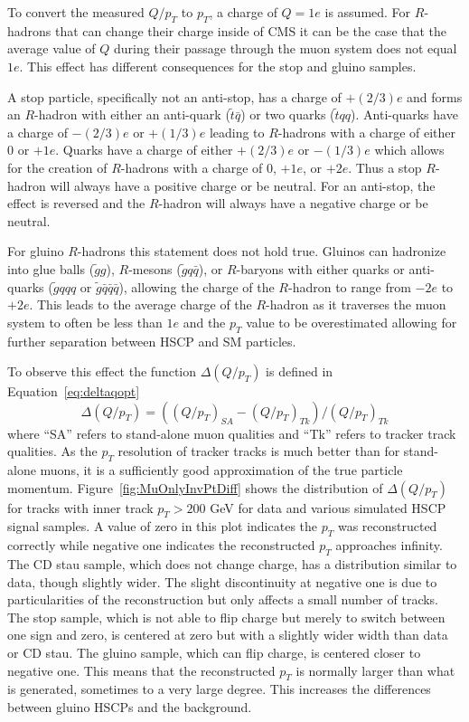 To convert the measured $Q/p_T$ to $p_T$, a charge of $Q=1e$ is assumed.
For $R$-hadrons that can change their charge inside of CMS it can be the case that the average value of $Q$ during their passage through the muon system does not equal $1e$.
This effect has different consequences for the stop and gluino samples.

A stop particle, specifically not an anti-stop, has a charge of $+(2/3)e$ and forms an $R$-hadron with either an anti-quark ($\tilde{t} \bar{q}$) or
two quarks  ($\tilde{t} q q$). Anti-quarks have a charge of $-(2/3)e$ or $+(1/3)e$ leading to $R$-hadrons with a charge
of either 0 or $+1e$. Quarks have a charge of either $+(2/3)e$ or $-(1/3)e$ which allows for
the creation of $R$-hadrons with a charge of 0, $+1e$, or $+2e$. Thus a stop $R$-hadron will always have a
positive charge or be neutral. For an anti-stop, the effect is reversed and the $R$-hadron will always have a
negative charge or be neutral.

For gluino $R$-hadrons this statement does not hold true. Gluinos can hadronize into glue balls ($\tilde{g}g$), $R$-mesons ($\tilde{g} q \bar{q}$), or
$R$-baryons  with either quarks or anti-quarks ($\tilde{g} qqq$ or $\tilde{g} \bar{q}\bar{q}\bar{q}$),
allowing the charge of the $R$-hadron to range from $-2e$ to $+2e$. This leads to the
average charge of the $R$-hadron as it traverses the muon system to often be less than $1e$ and the $p_T$ value to be overestimated allowing for further separation
between HSCP and SM particles.

To observe this effect the function
$\Delta(Q/p_T)$ is defined in Equation~\ref{eq:deltaqopt}
\begin{equation}
\Delta(Q/p_T) = ((Q/p_T)_{SA} - (Q/p_T)_{Tk})/(Q/p_T)_{Tk}
\label{eq:deltaqopt}
\end{equation}
where ``SA'' refers to stand-alone muon qualities and ``Tk'' refers to
tracker track qualities. As the $p_T$ resolution of tracker tracks is much better than for stand-alone muons, it is a sufficiently good approximation
of the true particle momentum. Figure~\ref{fig:MuOnlyInvPtDiff} shows the distribution of
$\Delta(Q/p_T)$ for tracks with inner track $p_T > 200$ GeV
for data and various simulated HSCP signal samples.
A value of zero in this plot indicates the $p_T$ was reconstructed correctly
while negative one indicates the reconstructed $p_T$ approaches infinity.
The CD stau sample, which does not change charge,
has a distribution similar to data, though slightly wider.
The slight discontinuity at negative one is due to particularities of the reconstruction but only affects a small number of tracks.
The stop sample, which is not able to flip charge but merely to switch
between one sign and zero, is centered at zero but with a slightly wider
width than data or CD stau.
The gluino sample, which can flip charge, is centered closer to negative one.
This means that
the reconstructed $p_T$ is normally larger than what is generated, sometimes
to a very large degree. This increases the differences between gluino HSCPs and the background.

